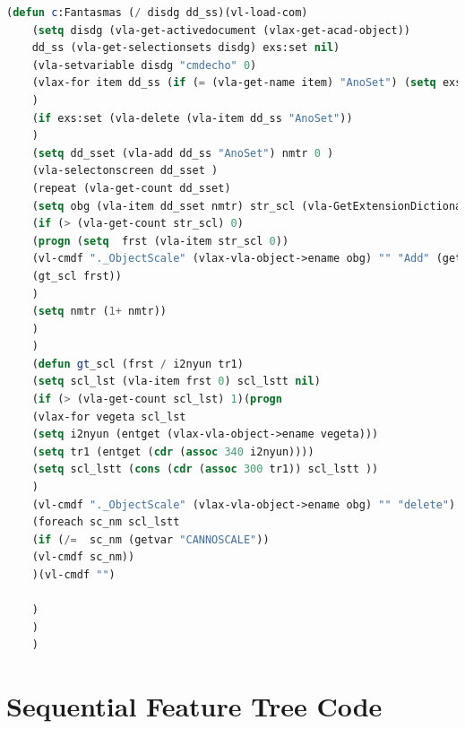 \documentclass[12pt,letterpaper,final]{report}
\begin{document}
\begin{lstlisting}[language=Lisp]
	(defun c:Fantasmas (/ disdg dd_ss)(vl-load-com)
	(setq disdg (vla-get-activedocument (vlax-get-acad-object))
	dd_ss (vla-get-selectionsets disdg) exs:set nil)
	(vla-setvariable disdg "cmdecho" 0)
	(vlax-for item dd_ss (if (= (vla-get-name item) "AnoSet") (setq exs:set T))
	)
	(if exs:set (vla-delete (vla-item dd_ss "AnoSet"))
	)
	(setq dd_sset (vla-add dd_ss "AnoSet") nmtr 0 )
	(vla-selectonscreen dd_sset )
	(repeat (vla-get-count dd_sset)
	(setq obg (vla-item dd_sset nmtr) str_scl (vla-GetExtensionDictionary obg))
	(if (> (vla-get-count str_scl) 0)
	(progn (setq  frst (vla-item str_scl 0))
	(vl-cmdf "._ObjectScale" (vlax-vla-object->ename obg) "" "Add" (getvar "CANNOSCALE") "")
	(gt_scl frst))
	)
	(setq nmtr (1+ nmtr))
	)
	)
	(defun gt_scl (frst / i2nyun tr1) 
	(setq scl_lst (vla-item frst 0) scl_lstt nil)
	(if (> (vla-get-count scl_lst) 1)(progn
	(vlax-for vegeta scl_lst  
	(setq i2nyun (entget (vlax-vla-object->ename vegeta)))
	(setq tr1 (entget (cdr (assoc 340 i2nyun))))
	(setq scl_lstt (cons (cdr (assoc 300 tr1)) scl_lstt ))
	)
	(vl-cmdf "._ObjectScale" (vlax-vla-object->ename obg) "" "delete")
	(foreach sc_nm scl_lstt
	(if (/=  sc_nm (getvar "CANNOSCALE"))
	(vl-cmdf sc_nm))
	)(vl-cmdf "")    
	
	)
	) 
	)
\end{lstlisting}

\chapter{Sequential Feature Tree Code}
\end{document}
